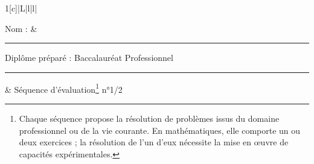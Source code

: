 \documentclass[11pt]{article}
\newcommand{\diplome}{Baccalauréat Professionnel}
\newcommand{\sequence}{1/2}
\begin{document}
\vfill 

\newpage


\small

\thispagestyle{empty}

\noindent\begin{tabularx}{1\linewidth}[c]{|L|l|l|}
  \hline
  \\
  \hline
  \rule[-1ex]{0ex}{4ex} Nom : & \rule{.3cm}{0cm}Diplôme
  préparé : \diplome\rule{.3cm}{0cm} &  Séquence
  d'évaluation\footnote{Chaque séquence propose la résolution de 
    problèmes issus du domaine professionnel ou de la vie courante. En
    mathématiques, elle comporte un ou deux exercices ; la résolution
    de l'un d'eux nécessite la mise en \oe{}uvre de capacités
    expérimentales.} n°\sequence \\
 \hline
\end{tabularx}

\vfill 
\end{document}
